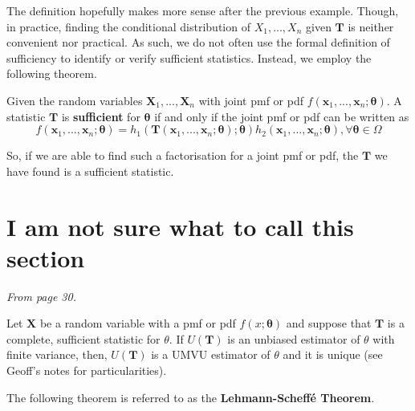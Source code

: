 \bigskip

The definition hopefully makes more sense after the previous example. 
Though, in practice, finding the conditional distribution 
of \(X_1,...,X_n\) given \(\bm{T}\) is neither convenient nor practical. 
As such, we do not often use the formal definition of sufficiency 
to identify or verify sufficient statistics. Instead, we employ 
the following theorem.


\begin{theorem}\label{thm: Factorisation Theorem}
    Given the random variables \(\bm{X}_1,...,\bm{X}_n\) with joint pmf or pdf \(f(\bm{x}_1,...,\bm{x}_n;\bm{\theta})\). 
    A statistic \(\bm{T}\) is \textbf{sufficient} for \(\bm{\theta}\) if and only if the joint pmf or pdf can be written as 
    \[f(\bm{x}_1,...,\bm{x}_n;\bm{\theta}) = h_1(\bm{T}(\bm{x}_1,...,\bm{x}_n;\bm{\theta});\bm{\theta})
    h_2(\bm{x}_1,...,\bm{x}_n;\bm{\theta}), \forall\bm{\theta}\in\Omega\]
\end{theorem}



So, if we are able to find such a factorisation for a joint pmf or pdf, 
the \(\bm{T}\) we have found is a sufficient statistic. 


\section{I am not sure what to call this section}\label{sec:Rao-Blackwell??}

\textit{From page 30.}

\begin{theorem}\label{thm:Rao-Blackwell}
    Let \(\bm{X}\) be a random variable with a pmf or pdf \(f(x;\bm{\theta})\) and suppose that \(\bm{T}\) is a complete, sufficient statistic for \(\theta\). 
    If \(U(\bm{T})\) is an unbiased estimator of \(\theta\) with finite variance, 
    then, \(U(\bm{T})\) is a UMVU estimator of \(\theta\) and it is unique (see Geoff's notes for particularities).
\end{theorem}

The following theorem is referred to as the \textbf{Lehmann-Scheff\'{e} Theorem}.

